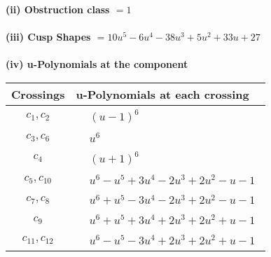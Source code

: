 \documentclass[1p]{elsarticle_modified}
\theoremstyle{definition}
\begin{document}
\flushleft \textbf{(ii) Obstruction class $= 1$}\\~\\
\flushleft \textbf{(iii) Cusp Shapes $= 10 u^5-6 u^4-38 u^3+5 u^2+33 u+27$}\\~\\
\newpage\renewcommand{\arraystretch}{1}
\flushleft \textbf{(iv) u-Polynomials at the component}\newline \\
\begin{tabular}{m{50pt}|m{274pt}}
Crossings & \hspace{64pt}u-Polynomials at each crossing \\
\hline $$\begin{aligned}c_{1},c_{2}\end{aligned}$$&$\begin{aligned}
&(u-1)^6
\end{aligned}$\\
\hline $$\begin{aligned}c_{3},c_{6}\end{aligned}$$&$\begin{aligned}
&u^6
\end{aligned}$\\
\hline $$\begin{aligned}c_{4}\end{aligned}$$&$\begin{aligned}
&(u+1)^6
\end{aligned}$\\
\hline $$\begin{aligned}c_{5},c_{10}\end{aligned}$$&$\begin{aligned}
&u^6- u^5+3 u^4-2 u^3+2 u^2- u-1
\end{aligned}$\\
\hline $$\begin{aligned}c_{7},c_{8}\end{aligned}$$&$\begin{aligned}
&u^6+u^5-3 u^4-2 u^3+2 u^2- u-1
\end{aligned}$\\
\hline $$\begin{aligned}c_{9}\end{aligned}$$&$\begin{aligned}
&u^6+u^5+3 u^4+2 u^3+2 u^2+u-1
\end{aligned}$\\
\hline $$\begin{aligned}c_{11},c_{12}\end{aligned}$$&$\begin{aligned}
&u^6- u^5-3 u^4+2 u^3+2 u^2+u-1
\end{aligned}$\\
\hline
\end{tabular}\\~\\
\end{document}
